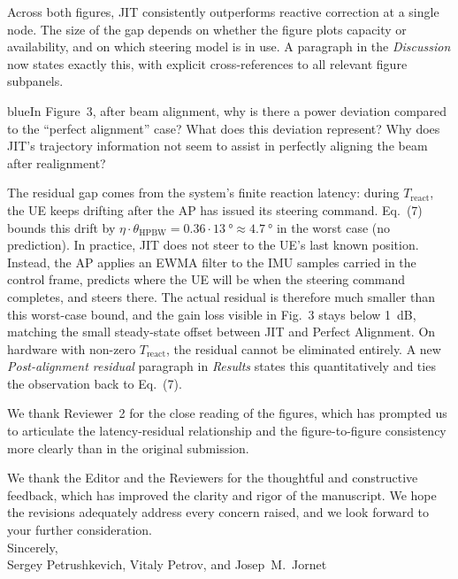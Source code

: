 \documentclass{article}
\newcommand{\blue}[1]{\begin{color}{blue}#1\end{color}}
\begin{document}
\noindent Across both figures, JIT consistently outperforms reactive correction at a single node. The size of the gap depends on whether the figure plots capacity or availability, and on which steering model is in use. A paragraph in the \emph{Discussion} now states exactly this, with explicit cross-references to all relevant figure subpanels.

\begin{tcbremark}
{\selectfont
\blue{In Figure~3, after beam alignment, why is there a power deviation compared to the ``perfect alignment'' case? What does this deviation represent? Why does JIT's trajectory information not seem to assist in perfectly aligning the beam after realignment?}
}
\end{tcbremark}

\noindent The residual gap comes from the system's finite reaction latency: during $T_{\text{react}}$, the UE keeps drifting after the AP has issued its steering command. Eq.~(7) bounds this drift by $\eta \cdot \theta_{\text{HPBW}} = 0.36 \cdot \SI{13}{\degree} \approx \SI{4.7}{\degree}$ in the worst case (no prediction). In practice, JIT does not steer to the UE's last known position. Instead, the AP applies an EWMA filter to the IMU samples carried in the control frame, predicts where the UE will be when the steering command completes, and steers there. The actual residual is therefore much smaller than this worst-case bound, and the gain loss visible in Fig.~3 stays below \SI{1}{\deci\bel}, matching the small steady-state offset between JIT and Perfect Alignment. On hardware with non-zero $T_{\text{react}}$, the residual cannot be eliminated entirely. A new \emph{Post-alignment residual} paragraph in \emph{Results} states this quantitatively and ties the observation back to Eq.~(7).

\bigskip
\noindent We thank Reviewer~2 for the close reading of the figures, which has prompted us to articulate the latency-residual relationship and the figure-to-figure consistency more clearly than in the original submission.

\newpage

\noindent We thank the Editor and the Reviewers for the thoughtful and constructive feedback, which has improved the clarity and rigor of the manuscript. We hope the revisions adequately address every concern raised, and we look forward to your further consideration.\\

\noindent Sincerely,\\

\noindent Sergey Petrushkevich, Vitaly Petrov, and Josep~M.~Jornet

\printbibliography
\end{document}
